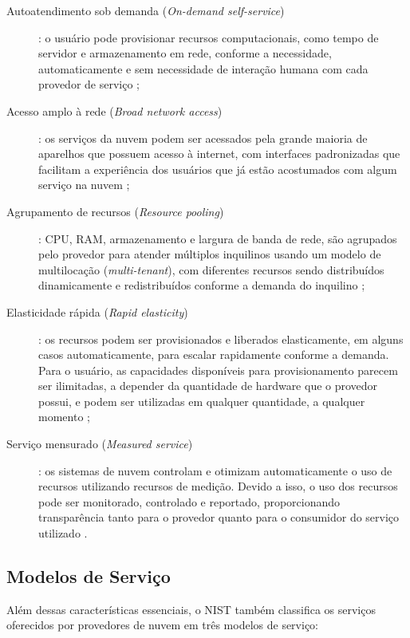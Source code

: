 \begin{description}
    \item[Autoatendimento sob demanda (\textit{On-demand self-service})]: o usuário pode provisionar recursos computacionais, como tempo de servidor e armazenamento em rede, conforme a necessidade, automaticamente e sem necessidade de interação humana com cada provedor de serviço \cite{mell2011};
    \item[Acesso amplo à rede (\textit{Broad network access})]: os serviços da nuvem podem ser acessados pela grande maioria de aparelhos que possuem acesso à internet, com interfaces padronizadas que facilitam a experiência dos usuários que já estão acostumados com algum serviço na nuvem \cite{mell2011};
    \item[Agrupamento de recursos (\textit{Resource pooling})]: CPU, RAM, armazenamento e largura de banda de rede, são agrupados pelo provedor para atender múltiplos inquilinos usando um modelo de multilocação (\textit{multi-tenant}), com diferentes recursos sendo distribuídos dinamicamente e redistribuídos conforme a demanda do inquilino \cite{mell2011};
    \item[Elasticidade rápida (\textit{Rapid elasticity})]: os recursos podem ser provisionados e liberados elasticamente, em alguns casos automaticamente, para escalar rapidamente conforme a demanda. Para o usuário, as capacidades disponíveis para provisionamento parecem ser ilimitadas, a depender da quantidade de hardware que o provedor possui,  e podem ser utilizadas em qualquer quantidade, a qualquer momento \cite{mell2011};
    \item[Serviço mensurado (\textit{Measured service})]: os sistemas de nuvem controlam e otimizam automaticamente o uso de recursos utilizando recursos de medição. Devido a isso, o uso dos recursos pode ser monitorado, controlado e reportado, proporcionando transparência tanto para o provedor quanto para o consumidor do serviço utilizado \cite{mell2011}.
\end{description}

\subsection{Modelos de Serviço}

Além dessas características essenciais, o NIST também classifica os serviços oferecidos por provedores de nuvem em três modelos de serviço:

